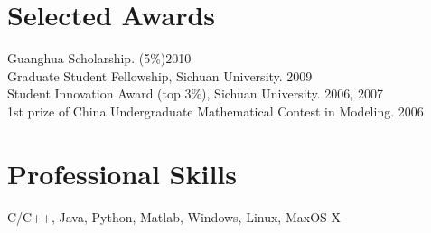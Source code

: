 \documentclass[line,margin]{res}
\begin{document}
\begin{resume}
\section{\sc Selected Awards}


Guanghua Scholarship.  (5\%)\hfill       2010\\
Graduate Student Fellowship, Sichuan University.  \hfill       2009\\
Student Innovation Award (top 3\%), Sichuan University.  \hfill       2006, 2007 \\%
1st prize of China Undergraduate Mathematical Contest in Modeling.  \hfill       2006

\section{\sc Professional Skills}
\smallskip

C/C++, Java, Python, Matlab, Windows, Linux, MaxOS X

\end{resume}

%
%
\end{document}

